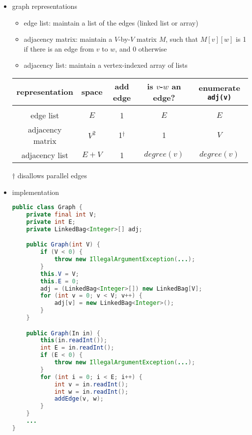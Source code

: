 \documentclass[8pt,a4paper,compress]{beamer}
\begin{document}
\begin{frame}[fragile]
\begin{itemize}
\item graph representations
\begin{itemize}
\item edge list: maintain a list of the edges (linked list or array)

\item adjacency matrix: maintain a $V$-by-$V$ matrix $M$, such that $M[v][w]$ is 1 if there is an edge from $v$ to $w$, and 0 otherwise

\item adjacency list: maintain a vertex-indexed array of lists
\end{itemize}

\begin{center}
\begin{tabular}{ccccc}
\textbf{representation} & \textbf{space} & \textbf{add edge} & \textbf{is $v$-$w$ an edge?} & \textbf{enumerate \lstinline{adj(v)}} \\ \hline \\
edge list & $E$ & 1 & $E$ & $E$ \\
adjacency matrix & $V^2$ & 1$^\dagger$ & 1 & $V$ \\ 
adjacency list & $E+V$ & 1 & $degree(v)$ & $degree(v)$ 
\end{tabular}  

\smallskip

\small $\dagger$ disallows parallel edges
\end{center}
\end{itemize}
\end{frame}

\begin{frame}[fragile]
\begin{itemize}
\item implementation
\begin{lstlisting}[language=Java]
public class Graph {
    private final int V;
    private int E;
    private LinkedBag<Integer>[] adj;

    public Graph(int V) {
        if (V < 0) {
            throw new IllegalArgumentException(...); 
        }
        this.V = V;
        this.E = 0;
        adj = (LinkedBag<Integer>[]) new LinkedBag[V];
        for (int v = 0; v < V; v++) {
            adj[v] = new LinkedBag<Integer>();
        }
    }

    public Graph(In in) {
        this(in.readInt());
        int E = in.readInt();
        if (E < 0) { 
            throw new IllegalArgumentException(...);
        }
        for (int i = 0; i < E; i++) {
            int v = in.readInt();
            int w = in.readInt();
            addEdge(v, w);
        }
    }
    ...
}
\end{lstlisting}
\end{itemize}
\end{frame}
\end{document}
